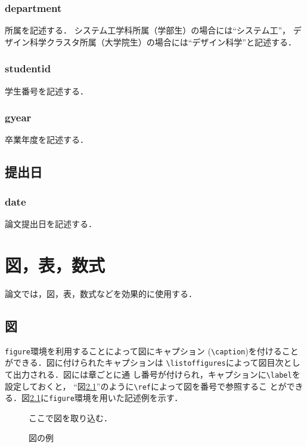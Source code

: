 \documentclass[11pt,dvipdfmx]{jreport}
\begin{document}
\subsection{department}
所属を記述する．
システム工学科所属（学部生）の場合には``システム工''，
デザイン科学クラスタ所属（大学院生）の場合には``デザイン科学''と記述する．

\subsection{studentid}
学生番号を記述する．

\subsection{gyear}
卒業年度を記述する．

\section{提出日}
\subsection{date}
論文提出日を記述する．


\chapter{図，表，数式}\label{chap:fig-tab-exp}

論文では，図，表，数式などを効果的に使用する．

\section{図}

{\tt figure}環境を利用することによって図にキャプション
(\verb|\caption|)を付けることができる．図に付けられたキャプションは
\verb|\listoffigures|によって図目次として出力される．図には章ごとに通
し番号が付けられ，キャプションに\verb|\label|を設定しておくと，
``図\ref{fig:sample}''のように\verb|\ref|によって図を番号で参照するこ
とができる．図\ref{fig:sample}に{\tt figure}環境を用いた記述例を示す．

\begin{figure}
  \centering
    ここで図を取り込む．
  \caption{図の例}
  \label{fig:sample}
\end{figure}
\end{document}
